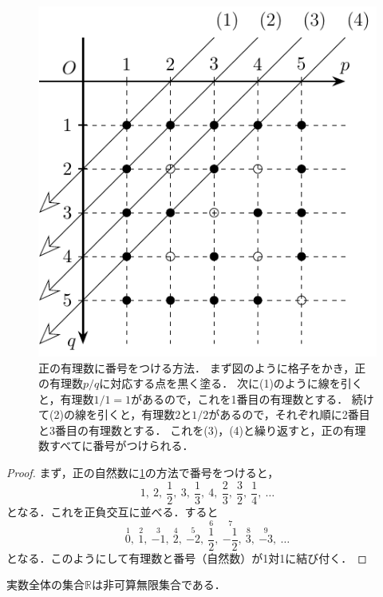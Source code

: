 \documentclass[../sotsu.tex]{subfiles}
\begin{document}
\begin{figure}[tbp]
    \centering
    \includegraphics[width=0.5\linewidth]{rational_countable.pdf}
    \caption{
        正の有理数に番号をつける方法．
        まず図のように格子をかき，正の有理数$p/q$に対応する点を黒く塗る．
        次に(1)のように線を引くと，有理数$1/1 = 1$があるので，これを1番目の有理数とする．
        続けて(2)の線を引くと，有理数$2$と$1/2$があるので，それぞれ順に2番目と3番目の有理数とする．
        これを(3)，(4)と繰り返すと，正の有理数すべてに番号がつけられる．
    }
    \label{fig:positive-rational-count}
\end{figure}


\begin{proof}
    まず，正の自然数に\cref{fig:positive-rational-count}の方法で番号をつけると，
    \[  1, \ 
        2, \ \frac{1}{2}, \ 
        3, \ \frac{1}{3}, \ 
        4, \ \frac{2}{3}, \ \frac{3}{2}, \ \frac{1}{4}, \ 
        \dotsc  \]
    となる．これを正負交互に並べる．すると
    \[  \overset{1}{0}, \ 
        \overset{2}{1}, \ \overset{3}{-1}, \ 
        \overset{4}{2}, \ \overset{5}{-2}, \ \overset{6}{\frac{1}{2}}, \ \overset{7}{-\frac{1}{2}}, \ 
        \overset{8}{3}, \ \overset{9}{-3}, \ \dotsc  \]
    となる．このようにして有理数と番号（自然数）が1対1に結び付く．
\end{proof}



\begin{theorem}
    実数全体の集合$ℝ$は非可算無限集合である\cite[\S 7]{uchida-set-2020}．
\end{theorem}
\end{document}
